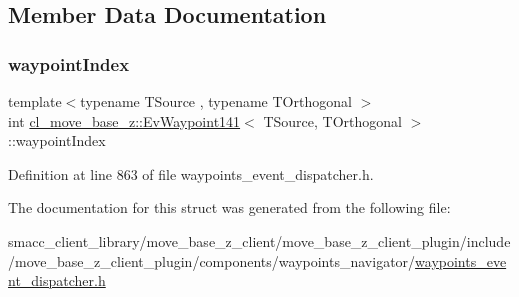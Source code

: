 \subsection{Member Data Documentation}
\mbox{\label{structcl__move__base__z_1_1EvWaypoint141_acb2d1a69e6c0eb5defa0ac8224668eb9}} 
\subsubsection{\texorpdfstring{waypoint\+Index}{waypointIndex}}
{\footnotesize\ttfamily template$<$typename T\+Source , typename T\+Orthogonal $>$ \\
int \hyperlink{structcl__move__base__z_1_1EvWaypoint141}{cl\+\_\+move\+\_\+base\+\_\+z\+::\+Ev\+Waypoint141}$<$ T\+Source, T\+Orthogonal $>$\+::waypoint\+Index}



Definition at line 863 of file waypoints\+\_\+event\+\_\+dispatcher.\+h.



The documentation for this struct was generated from the following file\+:\begin{DoxyCompactItemize}
\item 
smacc\+\_\+client\+\_\+library/move\+\_\+base\+\_\+z\+\_\+client/move\+\_\+base\+\_\+z\+\_\+client\+\_\+plugin/include/move\+\_\+base\+\_\+z\+\_\+client\+\_\+plugin/components/waypoints\+\_\+navigator/\hyperlink{waypoints__event__dispatcher_8h}{waypoints\+\_\+event\+\_\+dispatcher.\+h}\end{DoxyCompactItemize}
